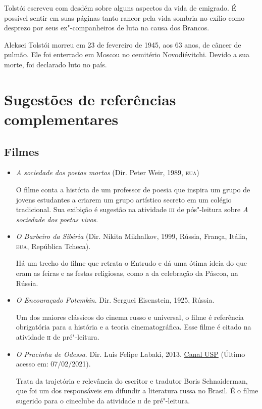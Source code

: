 \documentclass[11pt]{extarticle}
\begin{document}
Tolstói escreveu com desdém sobre alguns aspectos da vida de emigrado. É
possível sentir em suas páginas tanto rancor pela vida sombria no exílio
como desprezo por seus ex"-companheiros de luta na causa dos Brancos.

Aleksei Tolstói morreu em 23 de fevereiro de 1945, aos 63 anos, de
câncer de pulmão. Ele foi enterrado em Moscou no cemitério
Novodiévitchi. Devido a sua morte, foi declarado luto no país.

\section{Sugestões de referências complementares}\label{sugestoes}

\subsection{Filmes}

\begin{itemize}

\item \emph{A sociedade dos poetas mortos} (Dir. Peter Weir, 1989, \textsc{eua})

O filme conta a história de um professor de poesia que inspira um grupo de jovens estudantes
a criarem um grupo artístico secreto em um colégio tradicional. Sua exibição é sugestão na atividade \textsc{iii} de pós"-leitura sobre \emph{A sociedade dos poetas vivos}.

\item\emph{O Barbeiro da Sibéria} (Dir. Nikita Mikhalkov, 1999, Rússia,
França, Itália, \textsc{eua}, República Tcheca).

Há um trecho do filme que
retrata o Entrudo e dá uma ótima ideia do que eram as feiras e as festas
religiosas, como a da celebração da Páscoa, na Rússia.

\item \emph{O Encouraçado Potemkin}. Dir. Serguei Eisenstein, 1925,
Rússia.

Um dos maiores clássicos do cinema russo e universal, o filme é referência obrigatória para a história e a teoria cinematográfica. Esse filme
é citado na atividade \textsc{ii} de pré"-leitura.

\item \emph{O Pracinha de Odessa}. Dir. Luis Felipe Labaki, 2013. \href{https://www.youtube.com/watch?v=cXGSb7dsWo8}{Canal USP} (Último acesso em: 07/02/2021).

Trata da trajetória e relevância do escritor e tradutor Boris Schnaiderman, que foi um dos responsáveis
em difundir a literatura russa no Brasil. É o filme sugerido para o cineclube da atividade \textsc{ii} de pré"-leitura.

\end{itemize}
\end{document}
